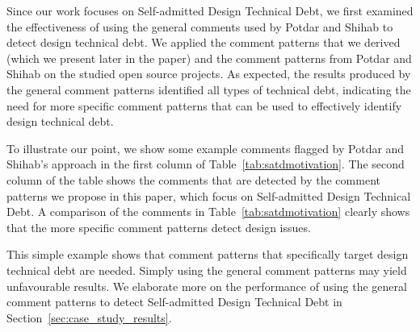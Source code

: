 \documentclass[conference]{IEEEtran}
\newcommand{\SADTD}{Self-admitted Design Technical Debt\xspace}
\begin{document}
Since our work focuses on \SADTD, we first examined the effectiveness of using the general comments used by Potdar and Shihab to detect design technical debt. We applied the comment patterns that we derived (which we present later in the paper) and the comment patterns from Potdar and Shihab on the studied open source projects. As expected, the results produced by the general comment patterns identified all types of technical debt, indicating the need for more specific comment patterns that can be used to effectively identify design technical debt.

To illustrate our point, we show some example comments flagged by Potdar and Shihab's approach in the first column of Table~\ref{tab:satdmotivation}. The second column of the table shows the comments that are detected by the comment patterns we propose in this paper, which focus on \SADTD. A comparison of the comments in Table~\ref{tab:satdmotivation} clearly shows that the more specific comment patterns detect design issues. 

This simple example shows that comment patterns that specifically target design technical debt are needed. Simply using the general comment patterns may yield unfavourable results. We elaborate more on the performance of using the general comment patterns to detect \SADTD in Section~\ref{sec:case_study_results}.

\end{document}

